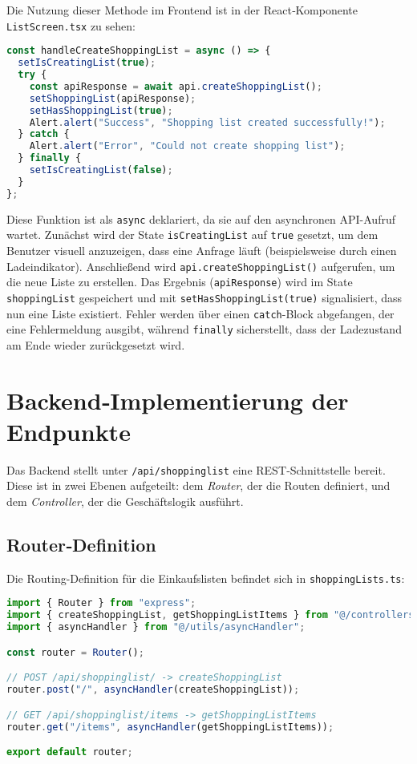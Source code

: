Die Nutzung dieser Methode im Frontend ist in der React‑Komponente \texttt{ListScreen.tsx} zu sehen:

\begin{lstlisting}[language=TypeScript,caption={Aufruf von \texttt{createShoppingList} im Frontend}]
const handleCreateShoppingList = async () => {
  setIsCreatingList(true);
  try {
    const apiResponse = await api.createShoppingList();
    setShoppingList(apiResponse);
    setHasShoppingList(true);
    Alert.alert("Success", "Shopping list created successfully!");
  } catch {
    Alert.alert("Error", "Could not create shopping list");
  } finally {
    setIsCreatingList(false);
  }
};
\end{lstlisting}

Diese Funktion ist als \texttt{async} deklariert, da sie auf den asynchronen API-Aufruf wartet. Zunächst wird der State \texttt{isCreatingList} auf \texttt{true} gesetzt, um dem Benutzer visuell anzuzeigen, dass eine Anfrage läuft (beispielsweise durch einen Ladeindikator). Anschließend wird \texttt{api.createShoppingList()} aufgerufen, um die neue Liste zu erstellen. Das Ergebnis (\texttt{apiResponse}) wird im State \texttt{shoppingList} gespeichert und mit \texttt{setHasShoppingList(true)} signalisiert, dass nun eine Liste existiert. Fehler werden über einen \texttt{catch}-Block abgefangen, der eine Fehlermeldung ausgibt, während \texttt{finally} sicherstellt, dass der Ladezustand am Ende wieder zurückgesetzt wird.

\section{Backend‑Implementierung der Endpunkte}
Das Backend stellt unter \texttt{/api/shoppinglist} eine REST‑Schnittstelle bereit. Diese ist in zwei Ebenen aufgeteilt: dem \emph{Router}, der die Routen definiert, und dem \emph{Controller}, der die Geschäftslogik ausführt.

\subsection{Router‑Definition}
Die Routing-Definition für die Einkaufslisten befindet sich in \texttt{shoppingLists.ts}:

\begin{lstlisting}[language=TypeScript,caption={Routing des Einkaufslisten‑Endpoints im Backend (\texttt{shoppingLists.ts})}]
import { Router } from "express";
import { createShoppingList, getShoppingListItems } from "@/controllers/shoppingListsController";
import { asyncHandler } from "@/utils/asyncHandler";

const router = Router();

// POST /api/shoppinglist/ -> createShoppingList
router.post("/", asyncHandler(createShoppingList));

// GET /api/shoppinglist/items -> getShoppingListItems
router.get("/items", asyncHandler(getShoppingListItems));

export default router;
\end{lstlisting}

